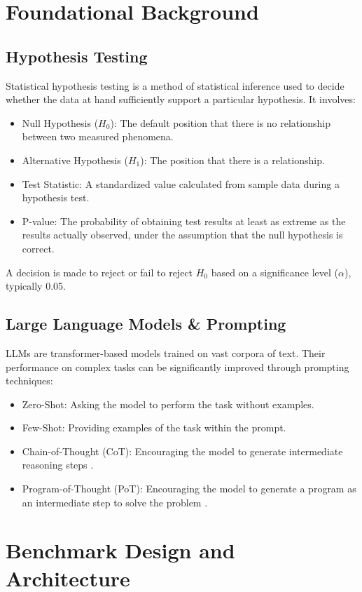 \documentclass{article}
\begin{document}
\section{Foundational Background}

\subsection{Hypothesis Testing}
Statistical hypothesis testing is a method of statistical inference used to decide whether the data at hand sufficiently support a particular hypothesis. It involves:
\begin{itemize}
    \item Null Hypothesis ($H_0$): The default position that there is no relationship between two measured phenomena.
    \item Alternative Hypothesis ($H_1$): The position that there is a relationship.
    \item Test Statistic: A standardized value calculated from sample data during a hypothesis test.
    \item P-value: The probability of obtaining test results at least as extreme as the results actually observed, under the assumption that the null hypothesis is correct.
\end{itemize}
A decision is made to reject or fail to reject $H_0$ based on a significance level ($\alpha$), typically 0.05.

\subsection{Large Language Models \& Prompting}
LLMs are transformer-based models trained on vast corpora of text. Their performance on complex tasks can be significantly improved through prompting techniques:
\begin{itemize}
    \item Zero-Shot: Asking the model to perform the task without examples.
    \item Few-Shot: Providing examples of the task within the prompt.
    \item Chain-of-Thought (CoT): Encouraging the model to generate intermediate reasoning steps \cite{wei2022chain}.
    \item Program-of-Thought (PoT): Encouraging the model to generate a program as an intermediate step to solve the problem \cite{chen2022program}.
\end{itemize}

\section{Benchmark Design and Architecture}
\label{sec:design-architecture}
\end{document}

